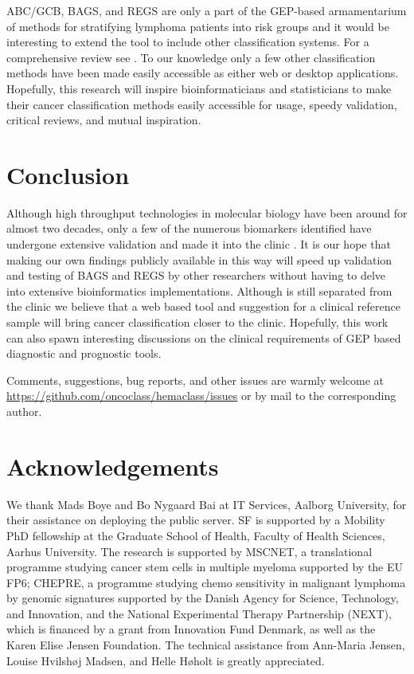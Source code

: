 \documentclass{article}
\begin{document}
ABC/GCB, BAGS, and REGS are only a part of the GEP-based armamentarium of methods for stratifying lymphoma patients into risk groups \citep{Shipp2002, Lossos2004a, Malumbres2008} and it would be interesting to extend the tool to include other classification systems.
For a comprehensive review see \citep{Coutinho2013}.
To our knowledge only a few other classification methods have been made easily accessible as either web or desktop applications.
Hopefully, this research will inspire bioinformaticians and statisticians to make their cancer classification methods easily accessible for usage, speedy validation, critical reviews, and mutual inspiration.

\section{Conclusion}
Although high throughput technologies in molecular biology have been around for almost two decades, only a few of the numerous biomarkers identified have undergone extensive validation and made it into the clinic \citep{Chen2012a}.
It is our hope that making our own findings publicly available in this way will speed up validation and testing of BAGS and REGS by other researchers without having to delve into extensive bioinformatics implementations.
Although \hemaClass{} is still separated from the clinic we believe that a web based tool and suggestion for a clinical reference sample will bring cancer classification closer to the clinic.
Hopefully, this work can also spawn interesting discussions on the clinical requirements of GEP based diagnostic and prognostic tools.

Comments, suggestions, bug reports, and other issues are warmly welcome at \url{https://github.com/oncoclass/hemaclass/issues} or by mail to the corresponding author.

{}
\section*{Acknowledgements}
We thank Mads Boye and Bo Nygaard Bai at IT Services, Aalborg University, for their assistance on deploying the public server.
SF is supported by a Mobility PhD fellowship at the Graduate School of Health, Faculty of Health Sciences, Aarhus University.
The research is supported by MSCNET, a translational programme studying cancer stem cells in multiple myeloma supported by the EU FP6; CHEPRE, a programme studying chemo sensitivity in malignant lymphoma by genomic signatures supported by the Danish Agency for Science, Technology, and Innovation, and the National Experimental Therapy Partnership (NEXT), which is financed by a grant from Innovation Fund Denmark, as well as the Karen Elise Jensen Foundation.
The technical assistance from Ann-Maria Jensen, Louise Hvilsh{\o}j Madsen, and Helle H{\o}holt is greatly appreciated.
\end{document}
